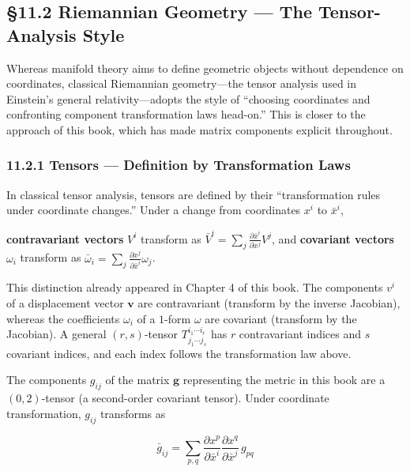 \documentclass[a4paper,12pt,openany]{book}
\begin{document}
\hypertarget{riemannian-geometry-the-tensor-analysis-style}{%
\subsection{§11.2 Riemannian Geometry — The Tensor-Analysis
Style}\label{riemannian-geometry-the-tensor-analysis-style}}

Whereas manifold theory aims to define geometric objects without
dependence on coordinates, classical Riemannian geometry—the tensor
analysis used in Einstein's general relativity—adopts the style of
``choosing coordinates and confronting component transformation laws
head-on.'' This is closer to the approach of this book, which has made
matrix components explicit throughout.

\hypertarget{tensors-definition-by-transformation-laws}{%
\subsubsection{11.2.1 Tensors — Definition by Transformation
Laws}\label{tensors-definition-by-transformation-laws}}

In classical tensor analysis, tensors are defined by their
``transformation rules under coordinate changes.'' Under a change from
coordinates \(x^i\) to \(\bar{x}^i\),

\textbf{contravariant vectors} \(V^i\) transform as
\(\bar{V}^i = \sum_j \frac{\partial \bar{x}^i}{\partial x^j} V^j\), and
\textbf{covariant vectors} \(\omega_i\) transform as
\(\bar{\omega}_i = \sum_j \frac{\partial x^j}{\partial \bar{x}^i} \omega_j\).

This distinction already appeared in Chapter 4 of this book. The
components \(v^i\) of a displacement vector \(\mathbf{v}\) are
contravariant (transform by the inverse Jacobian), whereas the
coefficients \(\omega_i\) of a \(1\)-form \(\omega\) are covariant
(transform by the Jacobian). A general \((r,s)\)-tensor
\(T^{i_1\cdots i_r}_{j_1\cdots j_s}\) has \(r\) contravariant indices
and \(s\) covariant indices, and each index follows the transformation
law above.

The components \(g_{ij}\) of the matrix \(\mathbf{g}\) representing the
metric in this book are a \((0,2)\)-tensor (a second-order covariant
tensor). Under coordinate transformation, \(g_{ij}\) transforms as

\[\bar{g}_{ij} = \sum_{p,q} \frac{\partial x^p}{\partial \bar{x}^i} \frac{\partial x^q}{\partial \bar{x}^j}\,g_{pq}\]
\end{document}
